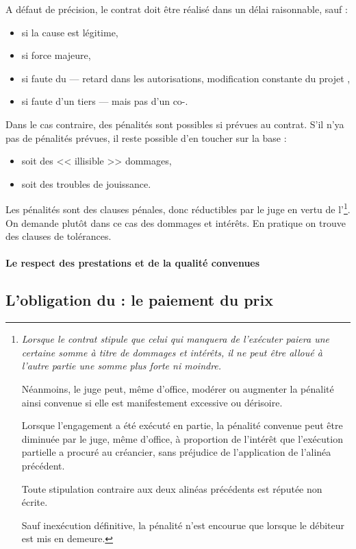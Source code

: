 				A défaut de précision, le contrat doit être réalisé dans un délai raisonnable, sauf :
				\begin{itemize}
					\item si la cause est légitime,
					\item si force majeure,
					\item si faute du \Mo --- retard dans les autorisations, modification constante du projet \etc,
					\item si faute d'un tiers --- mais pas d'un co-\lo.
				\end{itemize}
				Dans le cas contraire, des pénalités sont possibles si prévues au contrat. S'il n'ya pas de pénalités prévues, il reste possible d'en toucher sur la base :
				\begin{itemize}
					\item soit des << illisible >> dommages,
					\item soit des troubles de jouissance.
				\end{itemize}

			Les pénalités sont des clauses pénales, donc réductibles par le juge en vertu de l'\footnote{\itshape Lorsque le contrat stipule que celui qui manquera de l'exécuter paiera une certaine somme à titre de dommages et intérêts, il ne peut être alloué à l'autre partie une somme plus forte ni moindre.

				Néanmoins, le juge peut, même d'office, modérer ou augmenter la pénalité ainsi convenue si elle est manifestement excessive ou dérisoire.

				Lorsque l'engagement a été exécuté en partie, la pénalité convenue peut être diminuée par le juge, même d'office, à proportion de l'intérêt que l'exécution partielle a procuré au créancier, sans préjudice de l'application de l'alinéa précédent.

				Toute stipulation contraire aux deux alinéas précédents est réputée non écrite.

				Sauf inexécution définitive, la pénalité n'est encourue que lorsque le débiteur est mis en demeure.}. On demande plutôt dans ce cas des dommages et intérêts. En pratique on trouve des clauses de tolérances.

				\paragraph{Le respect des prestations et de la qualité convenues}

		\subsection[L'obligation du \Mo]{L'obligation du \Mo : le paiement du prix}

